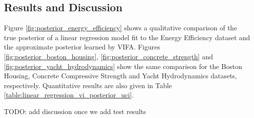 \documentclass[msc,deptreport.inf]{infthesis} %
\begin{document}
\subsection{Results and Discussion}

Figure \ref{fig:posterior_energy_efficiency} shows a qualitative comparison of the true posterior of a linear regression model fit to the Energy Efficiency dataset and the approximate posterior learned by VIFA. Figures \ref{fig:posterior_boston_housing}, \ref{fig:posterior_concrete_strength} and \ref{fig:posterior_yacht_hydrodynamics} show the same comparison for the Boston Housing, Concrete Compressive Strength and Yacht Hydrodynamics datasets, respectively. Quantitative results are also given in Table \ref{table:linear_regression_vi_posterior_uci}.

TODO: add discussion once we add test results
\end{document}
